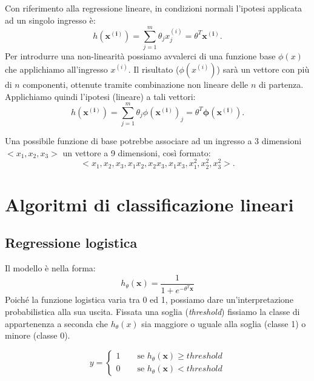 Con riferimento alla regressione lineare, in condizioni normali l'ipotesi applicata ad un singolo ingresso è:
\begin{equation*}
h(\mathbf{x^{(i)}})= \sum_{j=1}^m \theta_j x_j^{(i)}=\theta^T \mathbf{x^{(i)}}.
\end{equation*}
Per introdurre una non-linearità possiamo avvalerci di una funzione base $\phi(x)$ che applichiamo all'ingresso $x^{(i)}$. Il risultato ($\phi(x^{(i)})$) sarà un vettore con più di $n$ componenti, ottenute tramite combinazione non lineare delle $n$ di partenza. Applichiamo quindi l'ipotesi (lineare) a tali vettori:
\begin{equation*}
h(\mathbf{x^{(i)}})= \sum_{j=1}^m \theta_j \phi(\mathbf{x^{(i)}})_j=\theta^T \boldsymbol{\phi}(\mathbf{x^{(i)}}).
\end{equation*}

\begin{esempio}
Una possibile funzione di base potrebbe associare ad un ingresso a 3 dimensioni $<x_1, x_2, x_3>$ un vettore a 9 dimensioni, così formato:
\begin{equation*}
<x_1, x_2, x_3, x_1 x_2, x_2 x_3, x_1 x_3, x_1^2, x_2^2, x_3^2>.
\end{equation*}
\end{esempio}

\section{Algoritmi di classificazione lineari}

\subsection{Regressione logistica}
Il modello è nella forma:
\begin{equation*}
h_\theta(\mathbf{x}) = \frac{1}{1+e^{-\theta^T \mathbf{x}}}
\end{equation*}
Poiché la funzione logistica varia tra 0 ed 1, possiamo dare un'interpretazione probabilistica alla sua uscita. Fissata una soglia (\emph{threshold}) fissiamo la classe di appartenenza a seconda che $h_\theta(x)$ sia maggiore o uguale alla soglia (classe 1) o minore (classe 0).

\begin{equation*}
y=\begin{cases} 1  \qquad \mbox{se }  h_\theta(\mathbf{x})\geq threshold \\
0 \qquad \mbox{se } h_\theta(\mathbf{x})< threshold 
\end{cases}
\end{equation*}

